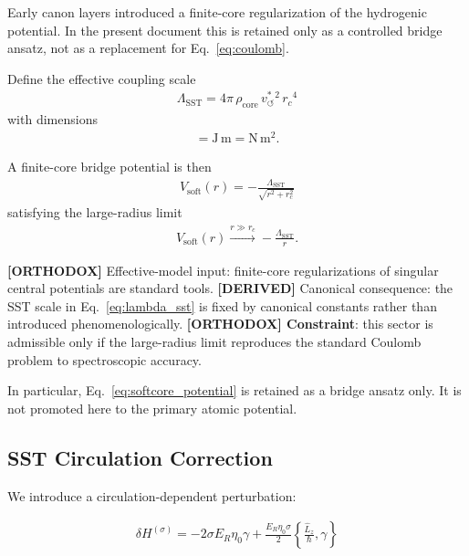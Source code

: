 \documentclass[11pt]{article}
\theoremstyle{definition}
\theoremstyle{plain}
\theoremstyle{remark}
\newcommand{\rhocore}{\rho_{\mathrm{core}}}
\newcommand{\rc}{{r_c}}
\newcommand{\vchar}{v_{\!\boldsymbol{\circlearrowleft}}^{\ast}}
\begin{document}
        Early canon layers introduced a finite-core regularization of the hydrogenic potential. In the present document this is retained only as a controlled bridge ansatz, not as a replacement for Eq.~\eqref{eq:coulomb}.

        Define the effective coupling scale
        \begin{align}
            \Lambda_{\mathrm{SST}} = 4\pi \, \rhocore \, \vchar{}^{2} \, \rc^{4}
            \label{eq:lambda_sst}
        \end{align}
        with dimensions
        \begin{align}
            [\Lambda_{\mathrm{SST}}] = \mathrm{J\,m} = \mathrm{N\,m^2}.
        \end{align}

        A finite-core bridge potential is then
        \begin{align}
            V_{\mathrm{soft}}(r) = -\frac{\Lambda_{\mathrm{SST}}}{\sqrt{r^2+r_c^2}}
            \label{eq:softcore_potential}
        \end{align}
        satisfying the large-radius limit
        \begin{align}
            V_{\mathrm{soft}}(r) \xrightarrow{r\gg r_c} -\frac{\Lambda_{\mathrm{SST}}}{r}.
        \end{align}

        \textbf{[ORTHODOX]} Effective-model input: finite-core regularizations of singular central potentials are standard tools.\newline
        \textbf{[DERIVED]} Canonical consequence: the SST scale in Eq.~\eqref{eq:lambda_sst} is fixed by canonical constants rather than introduced phenomenologically.\newline
        \textbf{[ORTHODOX] Constraint}: this sector is admissible only if the large-radius limit reproduces the standard Coulomb problem to spectroscopic accuracy.

        In particular, Eq.~\eqref{eq:softcore_potential} is retained as a bridge ansatz only. It is not promoted here to the primary atomic potential.

    \subsection{SST Circulation Correction}
        
        We introduce a circulation-dependent perturbation:
        
        \begin{align}
            \delta H^{(\sigma)} = -2\sigma E_R \eta_0 \gamma + \frac{E_R \eta_0 \sigma}{2} \left\{ \frac{\hat{L}_z}{\hbar}, \gamma \right\}
            \label{eq:sst_correction}
        \end{align}
        
\end{document}
